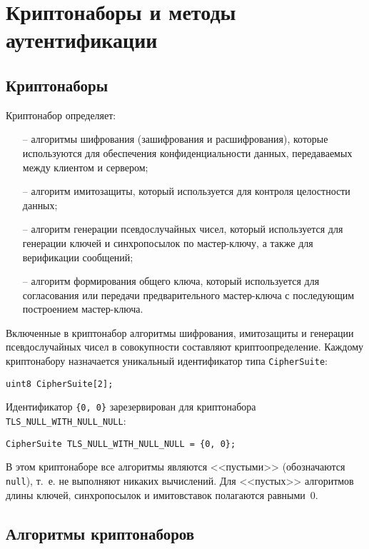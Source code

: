 \chapter{Криптонаборы и методы аутентификации}\label{CRYPTO}

\section{Криптонаборы}\label{CRYPTO.1}

Криптонабор определяет:
\begin{itemize}
\item[--] 
алгоритмы шифрования (зашифрования и расшифрования), которые 
используются для обеспечения конфиденциальности данных, передаваемых между 
клиентом и сервером; 

\item[--] 
алгоритм имитозащиты, который используется для контроля целостности 
данных; 

\item[--]
алгоритм генерации псевдослучайных чисел, который используется для 
генерации ключей и синхропосылок по мастер-ключу, а также для верификации 
сообщений; 

\item[--]
алгоритм формирования общего ключа, который используется для 
согласования или передачи предварительного мастер-ключа с последующим 
построением мастер-ключа. 
\end{itemize}

Включенные в криптонабор алгоритмы шифрования, имитозащиты и генерации 
псевдослучайных чисел в совокупности составляют криптоопределение. 
Каждому криптонабору назначается уникальный идентификатор типа 
\lstinline{CipherSuite}: 
\begin{lstlisting}
uint8 CipherSuite[2];
\end{lstlisting}

Идентификатор \lstinline|{0, 0}| зарезервирован для криптонабора 
\lstinline|TLS_NULL_WITH_NULL_NULL|: 
\begin{lstlisting}
CipherSuite TLS_NULL_WITH_NULL_NULL = {0, 0};
\end{lstlisting}

В этом криптонаборе все алгоритмы являются <<пустыми>> (обозначаются 
\lstinline{null}), т.~е. не выполняют никаких вычислений. Для <<пустых>> 
алгоритмов длины ключей, синхропосылок и имитовставок полагаются равными~0.  

\section{Алгоритмы криптонаборов}\label{CRYPTO.2}

